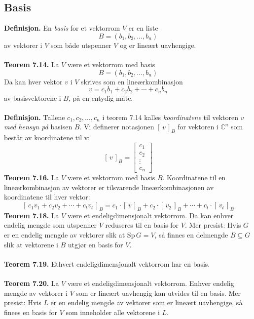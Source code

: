 \documentclass{article}
\begin{document}
\subsection{Basis}
\textbf{Definisjon.} En \textit{basis} for et vektorrom $V$ er en liste
\[ B = (b_1, b_2, \dots, b_n) \]
av vektorer i $V$ som både utspenner $V$ og er lineært uavhengige.
\\\\
\textbf{Teorem 7.14.} La $V$ være et vektorrom med basis
\[ B = (b_1, b_2, \dots, b_n) \]
Da kan hver vektor $v$ i $V$ skrives som en lineærkombinasjon
\[ v = c_1b_1 + c_2b_2 + \cdots + c_nb_n \]
av basisvektorene i $B$, på en entydig måte.
\\\\
\textbf{Definisjon.} Tallene $c_1, c_2, \dots, c_n$ i teorem 7.14 kalles \textit{koordinatene} til vektoren $v$ \textit{med hensyn på} basisen $B$. Vi definerer notasjonen $[\,v\,]_B$ for vektoren i $\mathbb{C}^n$ som består av koordinatene til v:
\[ [\,v\,]_B = \begin{bmatrix}
    c_1 \\ c_2 \\ \vdots \\ c_n
\end{bmatrix} \]
\textbf{Teorem 7.16.} La $V$ være et vektorrom med basis $B$. Koordinatene til en lineærkombinasjon av vektorer er tilsvarende lineærkombinasjonen av koordinatene til hver vektor:
\[ [\, c_1v_1 + c_2v_2 + \cdots + c_tv_t\,]_B = c_1 \cdot [\,v\,]_B + c_2 \cdot [\,v_2\,]_B + \cdots + c_t \cdot [\,v_t\,]_B \]
\textbf{Teorem 7.18.} La $V$ være et endeligdimensjonalt vektorrom. Da kan enhver endelig mengde som utspenner $V$ reduseres til en basis for $V$. Mer presist: Hvis $G$ er en endelig mengde av vektorer slik at $\text{Sp}\,G = V$, så finnes en delmengde $B \subseteq G$ slik at vektorene i $B$ utgjør en basis for $V$.
\\\\
\textbf{Teorem 7.19.} Ethvert endeligdimensjonalt vektorrom har en basis.
\\\\
\textbf{Teorem 7.20.} La $V$ være et endeligdimensjonalt vektorrom. Enhver endelig mengde av vektorer i $V$ som er lineært uavhengig kan utvides til en basis. Mer presist: Hvis $L$ er en endelig mengde av vektorer som er lineært uavhengige, så finees en basis for $V$ som inneholder alle vektorene i $L$.
\end{document}
